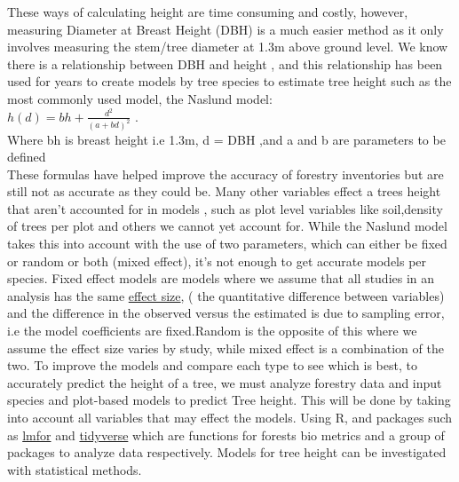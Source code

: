 \documentclass[a4paper,11pt,twoside]{report}
\begin{document}
\newpage
These ways of calculating height are time consuming and costly, however, measuring Diameter
at Breast Height (DBH) is a much easier method as it only involves measuring the stem/tree diameter at 1.3m above ground level. We know there is a relationship between DBH and height \cite{treephys}, and this relationship has been used for years to create models by tree species to estimate tree height such as the most commonly used model, the Naslund model:\\ $h(d)=bh + \frac{d^2}{(a+bd)^2}$ \cite{naslund1936skogsforsoksanstaltens}.\\ Where bh is breast height i.e 1.3m, d = DBH ,and a and b are parameters to be defined\\
These formulas have helped improve the accuracy of forestry inventories but are still not as accurate as they could be. Many other variables effect a trees height that aren’t accounted for in models \cite{ModelingNorwaySpruceScotsPine}, such as plot level variables like soil,density of trees per plot and others we cannot yet account for. While the Naslund model takes this into account with the use of two parameters, which can either be fixed or random or both (mixed effect), it’s not enough to get accurate models per species. Fixed effect models are models where we assume that all studies in an analysis has the same \href{https://www.leeds.ac.uk/educol/documents/00002182.htm}{effect size}, ( the quantitative difference between variables) and the difference in the observed versus the estimated is due to sampling error, i.e the model coefficients are fixed.Random is the opposite of this where we assume the effect size varies by study, while mixed effect is a combination of the two.\cite{RandomVsFixed} To improve the models and compare each type to see which is best, to accurately predict the height of a tree, we must analyze forestry data and input species and plot-based models to predict Tree height. This will be done by taking into account all variables that may effect the models. Using R, and packages such as \href{https://cran.r-project.org/web/packages/lmfor/lmfor.pdf}{lmfor} and \href{https://cran.r-project.org/web/packages/tidyverse/tidyverse.pdf}{tidyverse} which are functions for forests bio metrics and a group of packages to analyze data respectively. Models for tree height can be investigated with statistical methods.\newpage
\end{document}
